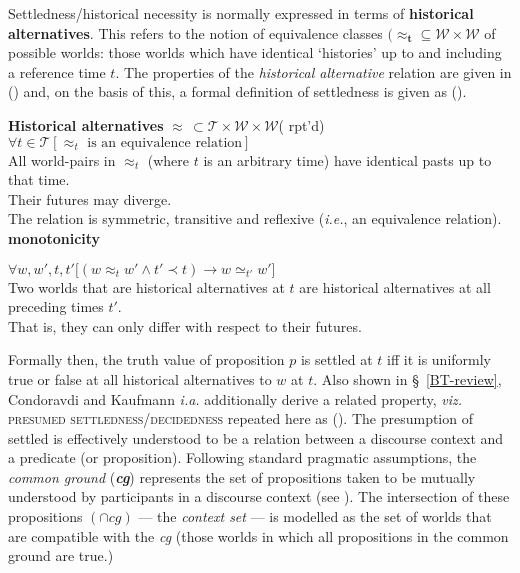 
Settledness/historical necessity is normally expressed in terms of \textbf{historical alternatives}. This refers to the notion of equivalence classes $\boldsymbol{(\approx_{t}}\subseteq\mathcal{W\times W}$ of possible worlds: those worlds which have identical `histories' up to and including a reference time $t$. The properties of the \textit{historical alternative} relation are given in (\nextx) and, on the basis of this, a formal definition of settledness is given as (\anextx).

\pex\textbf{Historical alternatives }$\boldsymbol\approx\,\subset\mathcal{T\times W\times W}$\trailingcitation( rpt'd)
\a $\forall t\in\mathcal T[\approx_t\text{ is an equivalence relation}]$\\
All world-pairs in $\approx_t$ (where $ t $ is an arbitrary time) have identical pasts up to that time.\\Their futures may diverge.\\
The relation is symmetric, transitive and reflexive (\textit{i.e.}, an equivalence relation).
\a\textbf{monotonicity}

$ \forall w,w',t,t'\big[(w\approx_t w'\wedge t'\prec t)\to w\simeq_{t'} w'\big]$\\
Two worlds that are historical alternatives at $t$ are historical alternatives at all preceding times $t'$.\\That is, they can only differ with respect to their futures.
\xe

Formally then, the truth value of proposition $ p $ is settled at $ t $ iff it is uniformly true or false at all historical alternatives to $ w $ at $ t $. Also shown in \S~\ref{BT-review}, Condoravdi and Kaufmann \textit{i.a.} additionally derive a related property, \textit{viz.} \textsc{presumed settledness\slash decided\-ness} repeated here as (). The presumption of settled is effectively understood to be a relation between a discourse context and a predicate (or proposition). Following standard pragmatic assumptions, the \textit{common ground} (\textbf{\textit{cg}}) represents the set of propositions taken to be mutually understood by participants in a discourse context (see ). The intersection of these propositions $ (\cap cg )$ --- the \textit{context set} --- is modelled as the set of worlds that are compatible with the \textit{cg} (those worlds in which all propositions in the common ground are true.)

